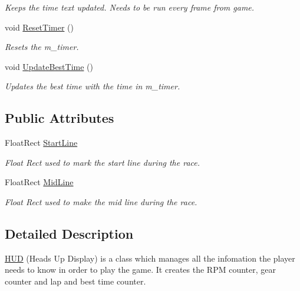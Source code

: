 \begin{DoxyCompactItemize}
\begin{DoxyCompactList}\small\item\em Keeps the time text updated. Needs to be run every frame from game. \end{DoxyCompactList}\item 
void \hyperlink{class_h_u_d_afafdadaf2c5c10c0e86f9fa8663069f8}{Reset\+Timer} ()
\begin{DoxyCompactList}\small\item\em Resets the m\+\_\+timer. \end{DoxyCompactList}\item 
void \hyperlink{class_h_u_d_a9fdbf33bc666f4f352dbb648bd0eb157}{Update\+Best\+Time} ()
\begin{DoxyCompactList}\small\item\em Updates the best time with the time in m\+\_\+timer. \end{DoxyCompactList}\end{DoxyCompactItemize}
\subsection*{Public Attributes}
\begin{DoxyCompactItemize}
\item 
\hypertarget{class_h_u_d_a7bb7d2643771405999f4d303441b14cb}{}Float\+Rect \hyperlink{class_h_u_d_a7bb7d2643771405999f4d303441b14cb}{Start\+Line}\label{class_h_u_d_a7bb7d2643771405999f4d303441b14cb}

\begin{DoxyCompactList}\small\item\em Float Rect used to mark the start line during the race. \end{DoxyCompactList}\item 
\hypertarget{class_h_u_d_a5fe514e987ad2dfac4ba3bf44b77244c}{}Float\+Rect \hyperlink{class_h_u_d_a5fe514e987ad2dfac4ba3bf44b77244c}{Mid\+Line}\label{class_h_u_d_a5fe514e987ad2dfac4ba3bf44b77244c}

\begin{DoxyCompactList}\small\item\em Float Rect used to make the mid line during the race. \end{DoxyCompactList}\end{DoxyCompactItemize}


\subsection{Detailed Description}
\hyperlink{class_h_u_d}{H\+U\+D} (Heads Up Display) is a class which manages all the infomation the player needs to know in order to play the game. It creates the R\+P\+M counter, gear counter and lap and best time counter.

